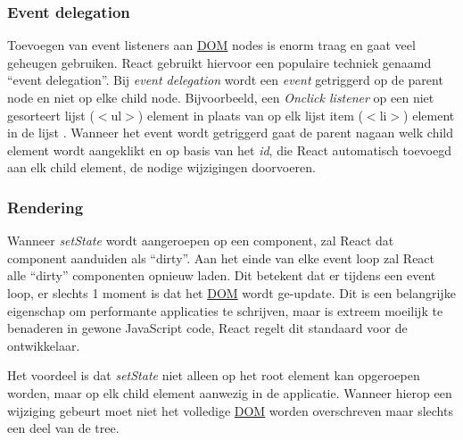 	\subsubsection{Event delegation}
		
		Toevoegen van event listeners aan \hyperref[dom]{DOM} nodes is enorm traag en gaat veel geheugen gebruiken. React gebruikt hiervoor een populaire techniek genaamd ``event delegation''. Bij \emph{event delegation} wordt een \emph{event} getriggerd op de parent node en niet op elke child node. Bijvoorbeeld, een \emph{Onclick listener} op een niet gesorteert lijst ($<$ul$>$) element in plaats van op elk lijst item ($<$li$>$) element in de lijst . Wanneer het event wordt getriggerd gaat de parent nagaan welk child element wordt aangeklikt en op basis van het \emph{id}, die React automatisch toevoegd aan elk child element, de nodige wijzigingen doorvoeren.
	
	\subsubsection{Rendering}
		
		Wanneer \emph{setState} wordt aangeroepen op een component, zal React dat component aanduiden als ``dirty''. Aan het einde van elke event loop zal React alle ``dirty'' componenten opnieuw laden. Dit betekent dat er tijdens een event loop, er slechts 1 moment is dat het \hyperref[dom]{DOM} wordt ge-update. Dit is een belangrijke eigenschap om performante applicaties te schrijven, maar is extreem moeilijk te benaderen in gewone JavaScript code, React regelt dit standaard voor de ontwikkelaar.
		
		Het voordeel is dat \emph{setState} niet alleen op het root element kan opgeroepen worden, maar op elk child element aanwezig in de applicatie. Wanneer hierop een wijziging gebeurt moet niet het volledige \hyperref[dom]{DOM} worden overschreven maar slechts een deel van de tree.
		
